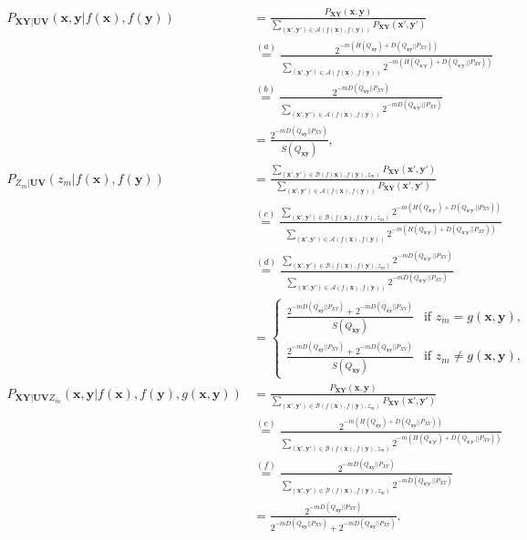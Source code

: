 \documentclass[journal,onecolumn]{IEEEtran}
\theoremstyle{definition}
\theoremstyle{remark}
\newcommand{\xm}{\bm{x}}
\newcommand{\ym}{\bm{y}}
\newcommand{\Xm}{\bm{X}}
\newcommand{\Ym}{\bm{Y}}
\newcommand{\Um}{\bm{U}}
\newcommand{\Vm}{\bm{V}}
\newcommand{\fx}{f(\xm)}
\newcommand{\fy}{f(\ym)}
\newcommand{\tQxy}{Q_{\xm\ym}}
\newcommand{\tQxby}{Q_{\xm\bar{\ym}}}
\newcommand{\tQbxy}{Q_{\bar{\xm}\ym}}
\newcommand{\tQbxby}{Q_{\bar{\xm}\bar{\ym}}}
\newcommand{\tQxyd}{Q_{\xm'\ym'}}
\begin{document}
    \begin{equation}
        \begin{aligned}\label{eq:probabilities}
        P_{\Xm\Ym|\Um\Vm}( \xm , \ym | \fx , \fy ) &= \frac{P_{\Xm\Ym}( \xm , \ym )}{\sum_{( \xm' , \ym' )\in \mathcal{A}( \fx , \fy )} P_{\Xm\Ym}( \xm' , \ym' )}\\
        &\overset{(a)}{=} \frac{2^{-m(H(\tQxy)+D(\tQxy||P_{XY}))}}{\sum_{( \xm' , \ym' )\in \mathcal{A}( \fx , \fy )} 2^{-m(H(\tQxyd)+D(\tQxyd||P_{XY}))}}\\
        &\overset{(b)}{=} \frac{2^{-mD(\tQxy||P_{XY})}}{\sum_{( \xm' , \ym' )\in \mathcal{A}( \fx , \fy )} 2^{-mD(\tQxyd||P_{XY})}}\\
        &=\frac{2^{-mD(\tQxy||P_{XY})}}{S(\tQxy)},\\
        P_{Z_m|\Um\Vm}( z_m | \fx , \fy ) &= \frac{\sum_{( \xm' , \ym' )\in \mathcal{B}( \fx , \fy ,z_m)} P_{\Xm\Ym}( \xm' , \ym' )}{\sum_{( \xm' , \ym' )\in \mathcal{A}( \fx , \fy )} P_{\Xm\Ym}( \xm' , \ym' )}\\
        &\overset{(c)}{=} \frac{\sum_{( \xm' , \ym' )\in \mathcal{B}( \fx , \fy ,z_m)} 2^{-m(H(\tQxyd)+D(\tQxyd||P_{XY}))}}{\sum_{( \xm' , \ym' )\in \mathcal{A}( \fx , \fy )} 2^{-m(H(\tQxyd)+D(\tQxyd||P_{XY}))}}\\
        &\overset{(d)}{=} \frac{\sum_{( \xm' , \ym' )\in \mathcal{B}( \fx , \fy ,z_m)} 2^{-mD(\tQxyd||P_{XY})}}{\sum_{( \xm' , \ym' )\in \mathcal{A}( \fx , \fy )} 2^{-mD(\tQxyd||P_{XY})}}\\
        &= 
        \begin{cases}
            \frac{2^{-mD(\tQxy||P_{XY})}+2^{-mD(\tQbxby||P_{XY})}}{S(\tQxy)} &\text{if } z_m=g(\xm,\ym),\\
            \frac{2^{-mD(\tQxby||P_{XY})}+2^{-mD(\tQbxy||P_{XY})}}{S(\tQxy)} &\text{if }z_m\neq g(\xm,\ym),
        \end{cases}\\
        P_{\Xm\Ym|\Um\Vm Z_m}( \xm , \ym | \fx , \fy , g(\xm,\ym)) &= \frac{P_{\Xm\Ym}( \xm , \ym )}{\sum_{( \xm' , \ym' )\in \mathcal{B}( \fx , \fy ,z_m)} P_{\Xm\Ym}( \xm' , \ym' )}\\
        &\overset{(e)}{=} \frac{2^{-m(H(\tQxy)+D(\tQxy||P_{XY}))}}{\sum_{( \xm' , \ym' )\in \mathcal{B}( \fx , \fy ,z_m)} 2^{-m(H(\tQxyd)+D(\tQxyd||P_{XY}))}}\\
        &\overset{(f)}{=} \frac{2^{-mD(\tQxy||P_{XY})}}{\sum_{( \xm' , \ym' )\in \mathcal{B}( \fx , \fy ,z_m)} 2^{-mD(\tQxyd||P_{XY})}}\\
        &= \frac{2^{-mD(\tQxy||P_{XY})}}{2^{-mD(\tQxy||P_{XY})}+2^{-mD(\tQbxby||P_{XY})}}.\\
        \end{aligned}
    \end{equation}
\end{document}
